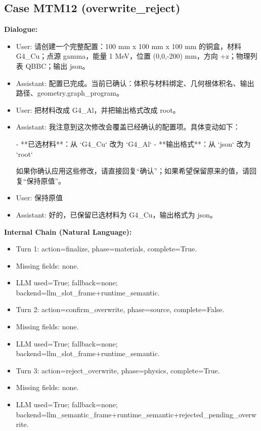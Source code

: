 \documentclass[11pt]{ctexart}
\begin{document}
\subsection{Case MTM12 (overwrite\_reject)}
\textbf{Dialogue:}
\begin{itemize}
\item User: 请创建一个完整配置：100 mm x 100 mm x 100 mm 的铜盒，材料 G4\_Cu；点源 gamma，能量 1 MeV，位置 (0,0,-200) mm，方向 +z；物理列表 QBBC；输出 json。
\item Assistant: 配置已完成。当前已确认：体积与材料绑定、几何根体积名、输出路径、geometry.graph\_program。
\item User: 把材料改成 G4\_Al，并把输出格式改成 root。
\item Assistant: 我注意到这次修改会覆盖已经确认的配置项。具体变动如下：

- **已选材料**：从 `G4\_Cu` 改为 `G4\_Al`
- **输出格式**：从 `json` 改为 `root`

如果你确认应用这些修改，请直接回复“确认”；如果希望保留原来的值，请回复“保持原值”。
\item User: 保持原值
\item Assistant: 好的，已保留已选材料为 G4\_Cu，输出格式为 json。
\end{itemize}
\textbf{Internal Chain (Natural Language):}
\begin{itemize}
\item Turn 1: action=finalize, phase=materials, complete=True.
\item Missing fields: none.
\item LLM used=True; fallback=none; backend=llm\_slot\_frame+runtime\_semantic.
\item Turn 2: action=confirm\_overwrite, phase=source, complete=False.
\item Missing fields: none.
\item LLM used=True; fallback=none; backend=llm\_slot\_frame+runtime\_semantic.
\item Turn 3: action=reject\_overwrite, phase=physics, complete=True.
\item Missing fields: none.
\item LLM used=True; fallback=none; backend=llm\_semantic\_frame+runtime\_semantic+rejected\_pending\_overwrite.
\end{itemize}
\end{document}
